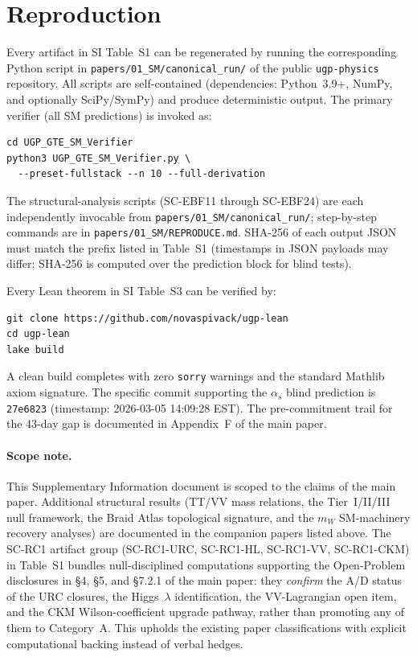 \documentclass[10pt]{article}
\begin{document}
\section*{Reproduction}

\begin{sloppypar}
Every artifact in SI Table~S1 can be regenerated by running the corresponding Python script in \nolinkurl{papers/01_SM/canonical_run/} of the public \texttt{ugp-physics} repository.  All scripts are self-contained (dependencies: Python~3.9+, NumPy, and optionally SciPy/SymPy) and produce deterministic output.  The primary verifier (all SM predictions) is invoked as:
\end{sloppypar}
\begin{verbatim}
cd UGP_GTE_SM_Verifier
python3 UGP_GTE_SM_Verifier.py \
  --preset-fullstack --n 10 --full-derivation
\end{verbatim}
\begin{sloppypar}
The structural-analysis scripts (SC-EBF11 through SC-EBF24) are each independently invocable from \texttt{papers/01\_SM/canonical\_run/}; step-by-step commands are in \texttt{papers/01\_SM/REPRODUCE.md}.  SHA-256 of each output JSON must match the prefix listed in Table~S1 (timestamps in JSON payloads may differ; SHA-256 is computed over the prediction block for blind tests).
\end{sloppypar}

Every Lean theorem in SI Table~S3 can be verified by:
\begin{verbatim}
git clone https://github.com/novaspivack/ugp-lean
cd ugp-lean
lake build
\end{verbatim}
\begin{sloppypar}
A clean build completes with zero \texttt{sorry} warnings and the standard Mathlib axiom signature.  The specific commit supporting the $\alpha_s$ blind prediction is \texttt{27e6823} (timestamp: 2026-03-05 14:09:28 EST).  The pre-commitment trail for the 43-day gap is documented in Appendix~F of the main paper.
\end{sloppypar}

\paragraph{Scope note.}
This Supplementary Information document is scoped to the claims of the main paper.  Additional structural results (TT/VV mass relations, the Tier~I/II/III null framework, the Braid Atlas topological signature, and the $m_W$ SM-machinery recovery analyses) are documented in the companion papers listed above.  The SC-RC1 artifact group (SC-RC1-URC, SC-RC1-HL, SC-RC1-VV, SC-RC1-CKM) in Table~S1 bundles null-disciplined computations supporting the Open-Problem disclosures in \S4, \S5, and \S7.2.1 of the main paper: they \emph{confirm} the A/D status of the URC closures, the Higgs~$\lambda$ identification, the VV-Lagrangian open item, and the CKM Wilson-coefficient upgrade pathway, rather than promoting any of them to Category~A.  This upholds the existing paper classifications with explicit computational backing instead of verbal hedges.



\end{document}
